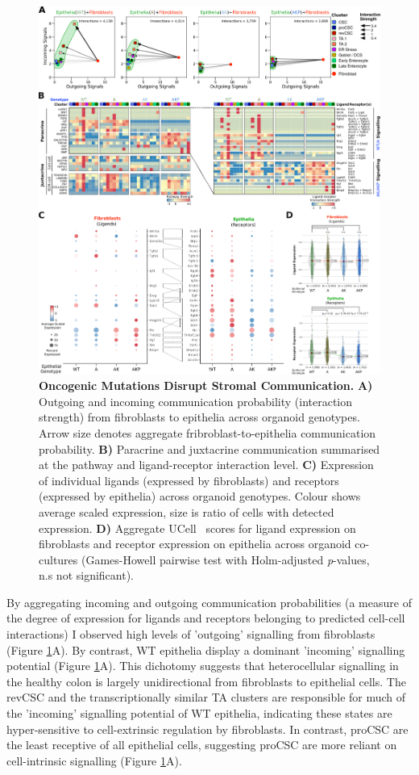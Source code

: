 \begin{figure}
    \centering
    \includegraphics{04seq/figs/4SEQ_CC.png}
    \caption{\textbf{Oncogenic Mutations Disrupt Stromal Communication.} \textbf{A)} Outgoing and incoming communication probability (interaction strength) from fibroblasts to epithelia across organoid genotypes. Arrow size denotes aggregate fribroblast-to-epithelia communication probability. \textbf{B)} Paracrine and juxtacrine communication summarised at the pathway and ligand-receptor interaction level. \textbf{C)} Expression of individual ligands (expressed by fibroblasts) and receptors (expressed by epithelia) across organoid genotypes. Colour shows average scaled expression, size is ratio of cells with detected expression. \textbf{D)} Aggregate UCell~\cite{andreatta_ucell_2021} scores for ligand expression on fibroblasts and receptor expression on epithelia across organoid co-cultures (Games-Howell pairwise test with Holm-adjusted \textit{p}-values, n.s not significant).}
    \label{fig:4cc}
\end{figure}

By aggregating incoming and outgoing communication probabilities (a measure of the degree of expression for ligands and receptors belonging to predicted cell-cell interactions) I observed high levels of 'outgoing' signalling from fibroblasts (Figure \ref{fig:4cc}A). By contrast, WT epithelia display a dominant 'incoming' signalling potential (Figure \ref{fig:4cc}A). This dichotomy suggests that heterocellular signalling in the healthy colon is largely unidirectional from fibroblasts to epithelial cells. The revCSC and the transcriptionally similar TA clusters are responsible for much of the 'incoming' signalling potential of WT epithelia, indicating these states are hyper-sensitive to cell-extrinsic regulation by fibroblasts. In contrast, proCSC are the least receptive of all epithelial cells, suggesting proCSC are more reliant on cell-intrinsic signalling (Figure \ref{fig:4cc}A). 


